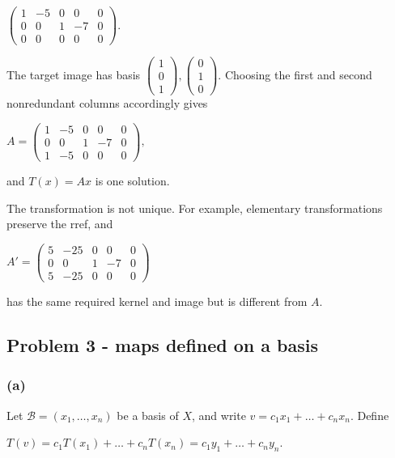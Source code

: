 \(\begin{pmatrix}
1 & {- 5} & 0 & 0 & 0 \\
0 & 0 & 1 & {- 7} & 0 \\
0 & 0 & 0 & 0 & 0
\end{pmatrix}.\)

The target image has basis \(\begin{pmatrix}
1 \\
0 \\
1
\end{pmatrix},\begin{pmatrix}
0 \\
1 \\
0
\end{pmatrix}\). Choosing the first and second nonredundant columns accordingly gives

\(A = \begin{pmatrix}
1 & {- 5} & 0 & 0 & 0 \\
0 & 0 & 1 & {- 7} & 0 \\
1 & {- 5} & 0 & 0 & 0
\end{pmatrix},\)

and \(T(x) = Ax\) is one solution.

The transformation is not unique. For example, elementary transformations preserve the rref, and

\(A' = \begin{pmatrix}
5 & {- 25} & 0 & 0 & 0 \\
0 & 0 & 1 & {- 7} & 0 \\
5 & {- 25} & 0 & 0 & 0
\end{pmatrix}\)

has the same required kernel and image but is different from \(A\).

\subsection{Problem 3 - maps defined on a basis}

\subsubsection{(a)}

Let \(\mathcal{B} = \left( {x_{1},\ldots,x_{n}} \right)\) be a basis of \(X\), and write \(v = c_{1}x_{1} + \ldots + c_{n}x_{n}\). Define

\(T(v) = c_{1}T\left( x_{1} \right) + \ldots + c_{n}T\left( x_{n} \right) = c_{1}y_{1} + \ldots + c_{n}y_{n}.\)

